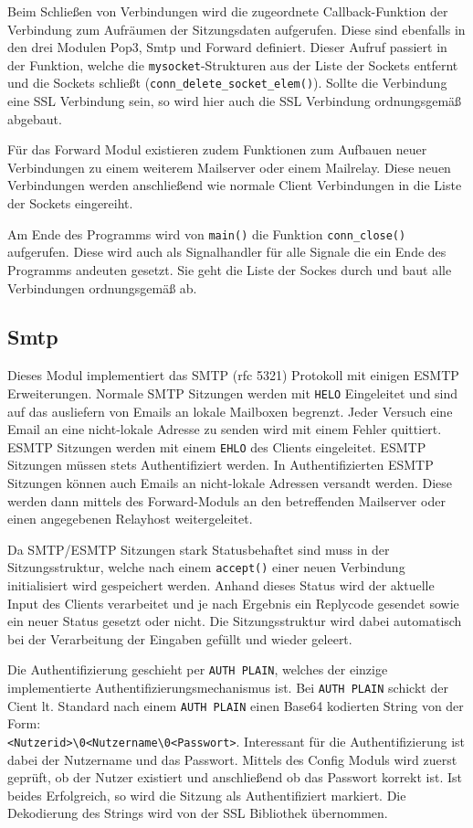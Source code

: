 \documentclass[final,a4paper,11pt,notitlepage,halfparskip]{scrreprt}
\begin{document}
Beim Schließen von Verbindungen wird die zugeordnete Callback-Funktion der
Verbindung zum Aufräumen der Sitzungsdaten aufgerufen. Diese sind ebenfalls in
den drei Modulen Pop3, Smtp und Forward definiert. Dieser Aufruf passiert in der
Funktion, welche die \texttt{mysocket}-Strukturen aus der Liste der Sockets
entfernt und die Sockets schließt (\texttt{conn\_delete\_socket\_elem()}).
Sollte die Verbindung eine SSL Verbindung sein, so wird hier auch die SSL
Verbindung ordnungsgemäß abgebaut.

Für das Forward Modul existieren zudem Funktionen zum Aufbauen neuer Verbindungen
zu einem weiterem Mailserver oder einem Mailrelay. Diese neuen Verbindungen
werden anschließend wie normale Client Verbindungen in die Liste der Sockets
eingereiht.

Am Ende des Programms wird von \texttt{main()} die Funktion 
\texttt{conn\_close()} aufgerufen. Diese wird auch als Signalhandler für alle
Signale die ein Ende des Programms andeuten gesetzt. Sie geht die Liste der
Sockes durch und baut alle Verbindungen ordnungsgemäß ab.


\subsection{Smtp}
Dieses Modul implementiert das SMTP (rfc 5321) Protokoll mit einigen ESMTP 
Erweiterungen. Normale SMTP Sitzungen werden mit \texttt{HELO} Eingeleitet und
sind auf das ausliefern von Emails an lokale Mailboxen begrenzt. Jeder Versuch
eine Email an eine nicht-lokale Adresse zu senden wird mit einem Fehler
quittiert. ESMTP Sitzungen werden mit einem \texttt{EHLO} des Clients
eingeleitet. ESMTP Sitzungen müssen stets Authentifiziert werden. In
Authentifizierten ESMTP Sitzungen können auch Emails an nicht-lokale Adressen
versandt werden. Diese werden dann mittels des Forward-Moduls an den betreffenden
Mailserver oder einen angegebenen Relayhost weitergeleitet.

Da SMTP/ESMTP Sitzungen stark Statusbehaftet sind muss in der Sitzungsstruktur,
welche nach einem \texttt{accept()} einer neuen Verbindung initialisiert wird
gespeichert werden. Anhand dieses Status wird der aktuelle Input des Clients
verarbeitet und je nach Ergebnis ein Replycode gesendet sowie ein neuer Status 
gesetzt oder nicht. Die Sitzungsstruktur wird dabei automatisch bei der
Verarbeitung der Eingaben gefüllt und wieder geleert.

Die Authentifizierung geschieht per \texttt{AUTH PLAIN}, welches der einzige
implementierte Authentifizierungsmechanismus ist. Bei \texttt{AUTH PLAIN}
schickt der Cient lt. Standard nach einem \texttt{AUTH PLAIN} einen Base64
kodierten String von der Form:\\
\texttt{<Nutzerid>\textbackslash0<Nutzername\textbackslash0<Passwort>}. 
Interessant für die Authentifizierung ist dabei der Nutzername und das Passwort.
Mittels des Config Moduls wird zuerst geprüft, ob der Nutzer existiert und
anschließend ob das Passwort korrekt ist. Ist beides Erfolgreich, so wird die
Sitzung als Authentifiziert markiert. Die Dekodierung des Strings wird von der
SSL Bibliothek übernommen.
\end{document}

